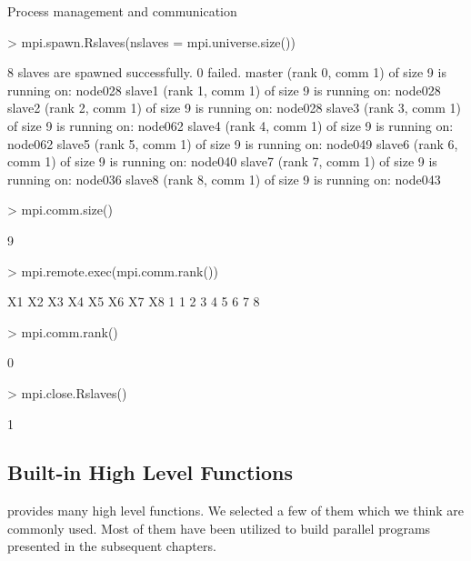 \begin{Example} Process management and communication 

\begin{Schunk}
\begin{Sinput}
> mpi.spawn.Rslaves(nslaves = mpi.universe.size())
\end{Sinput}
\begin{Soutput}
	8 slaves are spawned successfully. 0 failed.
master (rank 0, comm 1) of size 9 is running on: node028 
slave1 (rank 1, comm 1) of size 9 is running on: node028 
slave2 (rank 2, comm 1) of size 9 is running on: node028 
slave3 (rank 3, comm 1) of size 9 is running on: node062 
slave4 (rank 4, comm 1) of size 9 is running on: node062 
slave5 (rank 5, comm 1) of size 9 is running on: node049 
slave6 (rank 6, comm 1) of size 9 is running on: node040 
slave7 (rank 7, comm 1) of size 9 is running on: node036 
slave8 (rank 8, comm 1) of size 9 is running on: node043 
\end{Soutput}
\begin{Sinput}
> mpi.comm.size()
\end{Sinput}
\begin{Soutput}
[1] 9
\end{Soutput}
\begin{Sinput}
> mpi.remote.exec(mpi.comm.rank())
\end{Sinput}
\begin{Soutput}
  X1 X2 X3 X4 X5 X6 X7 X8
1  1  2  3  4  5  6  7  8
\end{Soutput}
\begin{Sinput}
> mpi.comm.rank()
\end{Sinput}
\begin{Soutput}
[1] 0
\end{Soutput}
\begin{Sinput}
> mpi.close.Rslaves()
\end{Sinput}
\begin{Soutput}
[1] 1
\end{Soutput}
\end{Schunk}
\label{ex:Rmpi2}
\end{Example}
 
\subsection{Built-in High Level Functions}

 provides many high level functions. We selected a few
of them which we think are commonly used. Most of them have been
utilized to build parallel programs presented in the subsequent
chapters.

